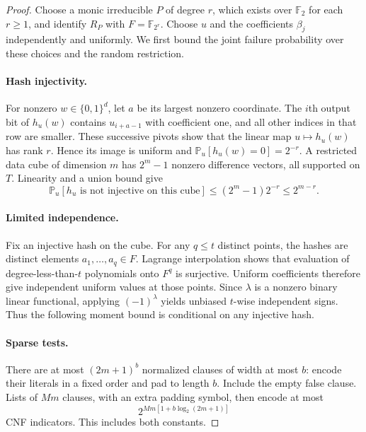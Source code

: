 \documentclass[11pt,letterpaper]{article}
\theoremstyle{definition}
\numberwithin{equation}{section}
\newcommand{\Prb}{\mathbb P}
\newcommand{\bits}{\{0,1\}}
\begin{document}
\begin{proof}
Choose a monic irreducible $P$ of degree $r$, which exists over
$\mathbb F_2$ for each $r\ge1$, and identify $R_P$ with
$F=\mathbb F_{2^r}$. Choose $u$ and the coefficients $\beta_j$ independently
and uniformly. We first bound the joint failure probability over these
choices and the random restriction.

\paragraph{Hash injectivity.}
For nonzero $w\in\bits^d$, let $a$ be its largest nonzero coordinate.
The $i$th output bit of $h_u(w)$ contains $u_{i+a-1}$ with coefficient one,
and all other indices in that row are smaller. These successive pivots
show that the linear map $u\mapsto h_u(w)$ has rank $r$. Hence its image
is uniform and $\Prb_u[h_u(w)=0]=2^{-r}$. A restricted data cube of dimension
$m$ has $2^m-1$ nonzero difference vectors, all supported on $T$.
Linearity and a union bound give
\begin{equation}\label{eq:collision}
 \Prb_u[h_u\text{ is not injective on this cube}]
 \le(2^m-1)2^{-r}\le2^{m-r}.
\end{equation}

\paragraph{Limited independence.}
Fix an injective hash on the cube. For any $q\le t$ distinct points, the
hashes are distinct elements $a_1,\ldots,a_q\in F$. Lagrange interpolation
shows that evaluation of degree-less-than-$t$ polynomials onto $F^q$ is
surjective. Uniform coefficients therefore give independent uniform
values at those points. Since $\lambda$ is a nonzero binary linear
functional, applying $(-1)^\lambda$ yields unbiased $t$-wise independent
signs. Thus the following moment bound is conditional on any injective hash.

\paragraph{Sparse tests.}
There are at most $(2m+1)^b$ normalized clauses of width at most $b$:
encode their literals in a fixed order and pad to length $b$. Include the
empty false clause. Lists of $Mm$ clauses, with an extra padding symbol,
then encode at most
\begin{equation}\label{eq:test-count}
 2^{Mm[1+b\log_2(2m+1)]}
\end{equation}
CNF indicators. This includes both constants.


\end{proof}
\end{document}
